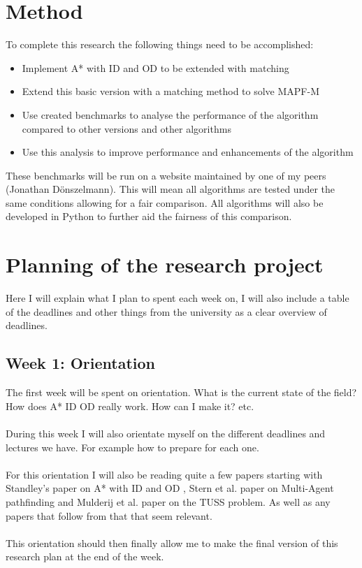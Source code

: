 \documentclass[english]{article}
\begin{document}
\section{Method}
To complete this research the following things need to be accomplished:
\begin{itemize}
	\item Implement A* with ID and OD to be extended with matching
	\item Extend this basic version with a matching method to solve MAPF-M
	\item Use created benchmarks to analyse the performance of the algorithm compared to other versions and other algorithms
	\item Use this analysis to improve performance and enhancements of the algorithm
\end{itemize}

These benchmarks will be run on a website maintained by one of my peers (Jonathan D\"onszelmann). This will mean all algorithms are tested under the same conditions allowing for a fair comparison. All algorithms will also be developed in Python to further aid the fairness of this comparison.

\section{Planning of the research project}
Here I will explain what I plan to spent each week on, I will also include a table of the deadlines and other things from the university as a clear overview of deadlines.

\subsection*{Week 1: Orientation}
The first week will be spent on orientation. What is the current state of the field?  How does A* ID OD really work. How can I make it? etc.
\\\\
During this week I will also orientate myself on the different deadlines and lectures we have. For example how to prepare for each one.
\\\\
For this orientation I will also be reading quite a few papers starting with Standley's paper on A* with ID and OD \cite{AStarIDOD_standley_2010}, Stern et al. paper on Multi-Agent pathfinding\cite{stern2019multiagent} and Mulderij et al. paper on the TUSS problem\cite{mulderij2020train}. As well as any papers that follow from that that seem relevant.
\\\\
This orientation should then finally allow me to make the final version of this research plan at the end of the week.
\end{document}

